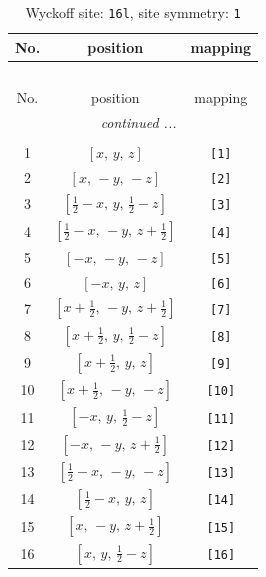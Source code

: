 \documentclass[fleqn,8pt]{jsarticle}
\begin{document}
\begin{longtable}{ccc}
\caption{Wyckoff site: {\tt 16l}, site symmetry: {\tt 1}}
 \\
 \hline \hline
No. & position & mapping \\ \hline \endfirsthead

\multicolumn{2}{l}{\tablename\ \thetable{}} \\
 \hline \hline
No. & position & mapping \\ \hline \endhead

 \hline \hline
\multicolumn{2}{r}{\footnotesize\it continued ...} \\ \endfoot

 \hline \hline
\multicolumn{2}{r}{} \\ \endlastfoot

1 & $\left[ x,\, y,\, z \right]$ & {\tt [1]} \\ \hline
2 & $\left[ x,\, - y,\, - z \right]$ & {\tt [2]} \\ \hline
3 & $\left[ \frac{1}{2} - x,\, y,\, \frac{1}{2} - z \right]$ & {\tt [3]} \\ \hline
4 & $\left[ \frac{1}{2} - x,\, - y,\, z + \frac{1}{2} \right]$ & {\tt [4]} \\ \hline
5 & $\left[ - x,\, - y,\, - z \right]$ & {\tt [5]} \\ \hline
6 & $\left[ - x,\, y,\, z \right]$ & {\tt [6]} \\ \hline
7 & $\left[ x + \frac{1}{2},\, - y,\, z + \frac{1}{2} \right]$ & {\tt [7]} \\ \hline
8 & $\left[ x + \frac{1}{2},\, y,\, \frac{1}{2} - z \right]$ & {\tt [8]} \\ \hline
9 & $\left[ x + \frac{1}{2},\, y,\, z \right]$ & {\tt [9]} \\ \hline
10 & $\left[ x + \frac{1}{2},\, - y,\, - z \right]$ & {\tt [10]} \\ \hline
11 & $\left[ - x,\, y,\, \frac{1}{2} - z \right]$ & {\tt [11]} \\ \hline
12 & $\left[ - x,\, - y,\, z + \frac{1}{2} \right]$ & {\tt [12]} \\ \hline
13 & $\left[ \frac{1}{2} - x,\, - y,\, - z \right]$ & {\tt [13]} \\ \hline
14 & $\left[ \frac{1}{2} - x,\, y,\, z \right]$ & {\tt [14]} \\ \hline
15 & $\left[ x,\, - y,\, z + \frac{1}{2} \right]$ & {\tt [15]} \\ \hline
16 & $\left[ x,\, y,\, \frac{1}{2} - z \right]$ & {\tt [16]} \\
\end{longtable}
\end{document}
